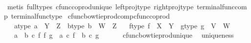\begin{isabellebody}
%
\isadelimproof
\ \ %
\endisadelimproof
%
\isatagproof
{}\isamarkupfalse%
\ {\isacharparenleft}{\kern0pt}metis\ {\isacharparenleft}{\kern0pt}full{\isacharunderscore}{\kern0pt}types{\isacharparenright}{\kern0pt}\ cfunc{\isacharunderscore}{\kern0pt}coprod{\isacharunderscore}{\kern0pt}unique\ left{\isacharunderscore}{\kern0pt}proj{\isacharunderscore}{\kern0pt}type\ right{\isacharunderscore}{\kern0pt}proj{\isacharunderscore}{\kern0pt}type\ terminal{\isacharunderscore}{\kern0pt}func{\isacharunderscore}{\kern0pt}comp\ terminal{\isacharunderscore}{\kern0pt}func{\isacharunderscore}{\kern0pt}type{\isacharparenright}{\kern0pt}%
\endisatagproof
{\isafoldproof}%
%
\isadelimproof
\isanewline
%
\endisadelimproof
\isanewline
{}\isamarkupfalse%
\ cfunc{\isacharunderscore}{\kern0pt}bowtieprod{\isacharunderscore}{\kern0pt}comp{\isacharunderscore}{\kern0pt}cfunc{\isacharunderscore}{\kern0pt}coprod{\isacharcolon}{\kern0pt}\isanewline
\ \ \ a{\isacharunderscore}{\kern0pt}type{\isacharcolon}{\kern0pt}\ {\isachardoublequoteopen}a\ {\isacharcolon}{\kern0pt}\ Y\ {\isasymrightarrow}\ Z{\isachardoublequoteclose}\ \ b{\isacharunderscore}{\kern0pt}type{\isacharcolon}{\kern0pt}\ {\isachardoublequoteopen}b\ {\isacharcolon}{\kern0pt}\ W\ {\isasymrightarrow}\ Z{\isachardoublequoteclose}\isanewline
\ \ \ f{\isacharunderscore}{\kern0pt}type{\isacharcolon}{\kern0pt}\ {\isachardoublequoteopen}f\ {\isacharcolon}{\kern0pt}\ X\ {\isasymrightarrow}\ Y{\isachardoublequoteclose}\ \ g{\isacharunderscore}{\kern0pt}type{\isacharcolon}{\kern0pt}\ {\isachardoublequoteopen}g\ {\isacharcolon}{\kern0pt}\ V\ {\isasymrightarrow}\ W{\isachardoublequoteclose}\isanewline
\ \ \ {\isachardoublequoteopen}{\isacharparenleft}{\kern0pt}a\ {\isasymamalg}\ b{\isacharparenright}{\kern0pt}\ {\isasymcirc}\isactrlsub c\ {\isacharparenleft}{\kern0pt}f\ {\isasymbowtie}\isactrlsub f\ g{\isacharparenright}{\kern0pt}\ {\isacharequal}{\kern0pt}\ {\isacharparenleft}{\kern0pt}a\ {\isasymcirc}\isactrlsub c\ f{\isacharparenright}{\kern0pt}\ {\isasymamalg}\ {\isacharparenleft}{\kern0pt}b\ {\isasymcirc}\isactrlsub c\ g{\isacharparenright}{\kern0pt}{\isachardoublequoteclose}\isanewline
%
\isadelimproof
%
\endisadelimproof
%
\isatagproof
{}\isamarkupfalse%
\ {\isacharminus}{\kern0pt}\ \isanewline
\ \ \isamarkupfalse%
\ cfunc{\isacharunderscore}{\kern0pt}bowtie{\isacharunderscore}{\kern0pt}prod{\isacharunderscore}{\kern0pt}unique\ \isamarkupfalse%
\ uniqueness{\isacharcolon}{\kern0pt}\isanewline

\end{isabellebody}
